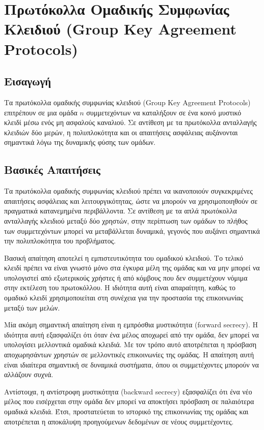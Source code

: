 \documentclass[12pt,a4paper]{report}
\begin{document}
\chapter{Πρωτόκολλα Ομαδικής Συμφωνίας Κλειδιού (Group Key Agreement Protocols)}

\section{Εισαγωγή}

Τα πρωτόκολλα ομαδικής συμφωνίας κλειδιού (Group Key Agreement Protocols) επιτρέπουν σε μια ομάδα $n$ συμμετεχόντων να καταλήξουν σε ένα κοινό μυστικό κλειδί μέσω ενός μη ασφαλούς καναλιού. Σε αντίθεση με τα πρωτόκολλα ανταλλαγής κλειδιών δύο μερών, η πολυπλοκότητα και οι απαιτήσεις ασφάλειας αυξάνονται σημαντικά λόγω της δυναμικής φύσης των ομάδων.

\section{Βασικές Απαιτήσεις}

Τα πρωτόκολλα ομαδικής συμφωνίας κλειδιού πρέπει να ικανοποιούν συγκεκριμένες απαιτήσεις ασφάλειας και λειτουργικότητας, ώστε να μπορούν να χρησιμοποιηθούν σε πραγματικά κατανεμημένα περιβάλλοντα. Σε αντίθεση με τα απλά πρωτόκολλα ανταλλαγής κλειδιού μεταξύ δύο χρηστών, στην περίπτωση των ομάδων το πλήθος των συμμετεχόντων μπορεί να μεταβάλλεται δυναμικά, γεγονός που αυξάνει σημαντικά την πολυπλοκότητα του προβλήματος.

Βασική απαίτηση αποτελεί η εμπιστευτικότητα του ομαδικού κλειδιού. Το τελικό κλειδί πρέπει να είναι γνωστό μόνο στα έγκυρα μέλη της ομάδας και να μην μπορεί να υπολογιστεί από εξωτερικούς χρήστες ή από κόμβους που δεν συμμετέχουν νόμιμα στην εκτέλεση του πρωτοκόλλου. Η ιδιότητα αυτή είναι απαραίτητη, καθώς το ομαδικό κλειδί χρησιμοποιείται στη συνέχεια για την προστασία της επικοινωνίας μεταξύ των μελών.

Μία ακόμη σημαντική απαίτηση είναι η εμπρόσθια μυστικότητα (forward secrecy). Η ιδιότητα αυτή εξασφαλίζει ότι όταν ένα μέλος αποχωρεί από την ομάδα, δεν μπορεί να υπολογίσει μελλοντικά ομαδικά κλειδιά. Με τον τρόπο αυτό αποτρέπεται η πρόσβαση αποχωρησάντων χρηστών σε μελλοντικές επικοινωνίες της ομάδας. Η απαίτηση αυτή είναι ιδιαίτερα σημαντική σε δυναμικά συστήματα, όπου οι συμμετέχοντες μπορούν να αλλάζουν συχνά.

Αντίστοιχα, η αντίστροφη μυστικότητα (backward secrecy) εξασφαλίζει ότι ένα νέο μέλος που εισέρχεται στην ομάδα δεν μπορεί να αποκτήσει πρόσβαση σε παλαιότερα ομαδικά κλειδιά. Έτσι, προστατεύεται το ιστορικό της επικοινωνίας της ομάδας και αποτρέπεται η αποκάλυψη προηγούμενων δεδομένων σε νέους συμμετέχοντες.
\end{document}
